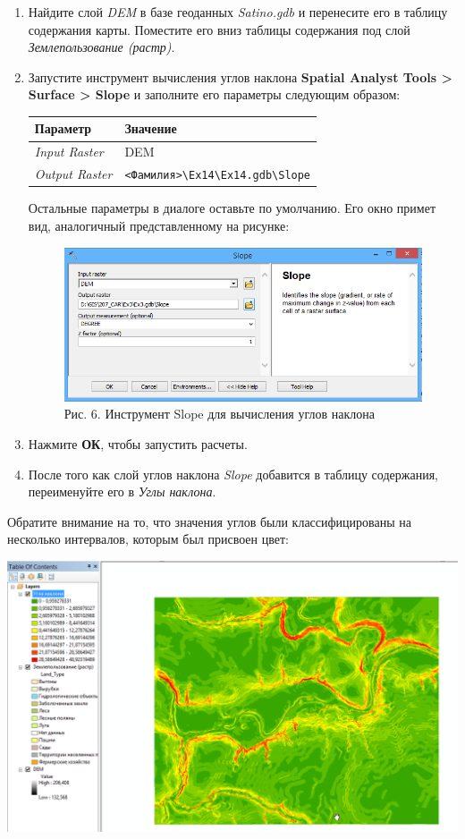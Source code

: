 \documentclass[]{book}
\theoremstyle{definition}
\theoremstyle{definition}
\theoremstyle{definition}
\theoremstyle{remark}
\begin{document}
\begin{enumerate}
\def\labelenumi{\arabic{enumi}.}
\item
  Найдите слой \emph{DEM} в базе геоданных \emph{Satino.gdb} и
  перенесите его в таблицу содержания карты. Поместите его вниз таблицы
  содержания под слой \emph{Землепользование (растр)}.
\item
  Запустите инструмент вычисления углов наклона \textbf{Spatial Analyst
  Tools \textgreater{} Surface \textgreater{} Slope} и заполните его
  параметры следующим образом:

  \begin{longtable}[]{@{}ll@{}}
  \toprule
  Параметр & Значение\tabularnewline
  \midrule
  \endhead
  \emph{Input Raster} & DEM\tabularnewline
  \emph{Output Raster} &
  \texttt{\textless{}Фамилия\textgreater{}\textbackslash{}Ex14\textbackslash{}Ex14.gdb\textbackslash{}Slope}\tabularnewline
  \bottomrule
  \end{longtable}

  Остальные параметры в диалоге оставьте по умолчанию. Его окно примет
  вид, аналогичный представленному на рисунке:

  \begin{figure}
  \centering
  \includegraphics{images/Ex14/image7.png}
  \caption{Рис. 6. Инструмент Slope для вычисления углов наклона}
  \end{figure}
\item
  Нажмите \textbf{ОК}, чтобы запустить расчеты.
\item
  После того как слой углов наклона \emph{Slope} добавится в таблицу
  содержания, переименуйте его в \emph{Углы наклона}.
\end{enumerate}

Обратите внимание на то, что значения углов были классифицированы на
несколько интервалов, которым был присвоен цвет:

\includegraphics{images/Ex14/image8.png}
\end{document}
